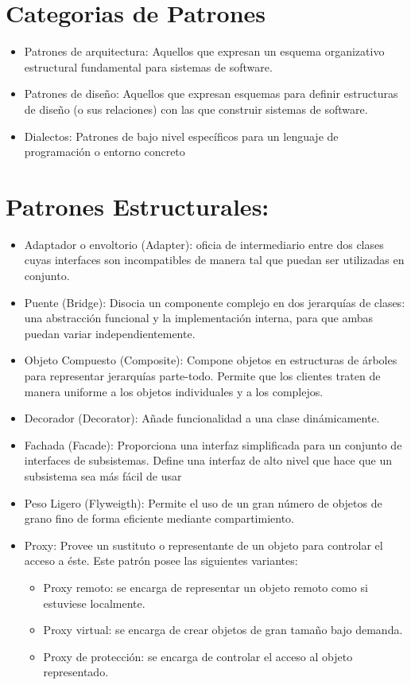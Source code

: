 \documentclass[10pt]{article}
\begin{document}
{{\section{Categorias de Patrones}
\begin{itemize}

\item Patrones de arquitectura: Aquellos que expresan un esquema organizativo estructural fundamental para 
sistemas de software.
\item Patrones de diseño: Aquellos que expresan esquemas para definir estructuras de diseño (o sus relaciones) 
con las que construir sistemas de software.
\item Dialectos: Patrones de bajo nivel específicos para un lenguaje de programación o entorno concreto
\end{itemize}

\newpage
\section{Patrones Estructurales:}
\begin{itemize}


\item Adaptador o envoltorio (Adapter): oficia de intermediario entre dos clases cuyas interfaces 
son incompatibles de manera tal que puedan ser utilizadas en 
conjunto. 
\item Puente (Bridge): Disocia un componente complejo en dos jerarquías de 
clases: una abstracción funcional y la implementación interna, para 
que ambas puedan variar independientemente.
\item Objeto Compuesto (Composite): Compone objetos en estructuras de árboles para 
representar jerarquías parte-todo. Permite que los clientes traten de 
manera uniforme a los objetos individuales y a los complejos. 
\item Decorador (Decorator): Añade funcionalidad a una clase dinámicamente.
\item Fachada (Facade): Proporciona una interfaz simplificada para un conjunto de 
interfaces de subsistemas. Define una interfaz de alto nivel que 
hace que un subsistema sea más fácil de usar
\item Peso Ligero (Flyweigth): Permite el uso de un gran número de objetos de grano 
fino de forma eficiente mediante compartimiento.
\item Proxy: Provee un sustituto o representante de un objeto para 
controlar el acceso a éste. Este patrón posee las siguientes variantes:
\begin{itemize} 
\item Proxy remoto: se encarga de representar un objeto remoto 
como si estuviese localmente. 
\item Proxy virtual: se encarga de crear objetos de gran tamaño bajo 
demanda. 
\item Proxy de protección: se encarga de controlar el acceso al objeto 
representado.
\end{itemize}


\end{itemize}}}
\end{document}
